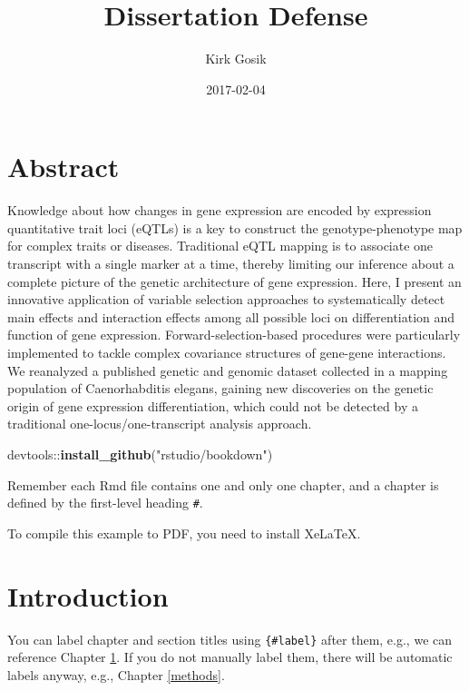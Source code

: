 \documentclass[]{book}
\title{Dissertation Defense}
\author{Kirk Gosik}
\date{2017-02-04}
\newenvironment{Shaded}{\begin{snugshade}}{\end{snugshade}}
\newcommand{\KeywordTok}[1]{\textcolor[rgb]{0.13,0.29,0.53}{\textbf{{#1}}}}
\newcommand{\StringTok}[1]{\textcolor[rgb]{0.31,0.60,0.02}{{#1}}}
\newcommand{\NormalTok}[1]{{#1}}
\theoremstyle{definition}
\theoremstyle{definition}
\theoremstyle{remark}
\begin{document}
\maketitle

{
\setcounter{tocdepth}{1}
\tableofcontents
}
\chapter*{Abstract}\label{abstract}

Knowledge about how changes in gene expression are encoded by expression
quantitative trait loci (eQTLs) is a key to construct the
genotype-phenotype map for complex traits or diseases. Traditional eQTL
mapping is to associate one transcript with a single marker at a time,
thereby limiting our inference about a complete picture of the genetic
architecture of gene expression. Here, I present an innovative
application of variable selection approaches to systematically detect
main effects and interaction effects among all possible loci on
differentiation and function of gene expression. Forward-selection-based
procedures were particularly implemented to tackle complex covariance
structures of gene-gene interactions. We reanalyzed a published genetic
and genomic dataset collected in a mapping population of Caenorhabditis
elegans, gaining new discoveries on the genetic origin of gene
expression differentiation, which could not be detected by a traditional
one-locus/one-transcript analysis approach.

\begin{Shaded}
\begin{Highlighting}[]
\NormalTok{devtools::}\KeywordTok{install_github}\NormalTok{(}\StringTok{"rstudio/bookdown"}\NormalTok{)}
\end{Highlighting}
\end{Shaded}

Remember each Rmd file contains one and only one chapter, and a chapter
is defined by the first-level heading \texttt{\#}.

To compile this example to PDF, you need to install XeLaTeX.

\chapter{Introduction}\label{intro}

You can label chapter and section titles using \texttt{\{\#label\}}
after them, e.g., we can reference Chapter \ref{intro}. If you do not
manually label them, there will be automatic labels anyway, e.g.,
Chapter \ref{methods}.
\end{document}
